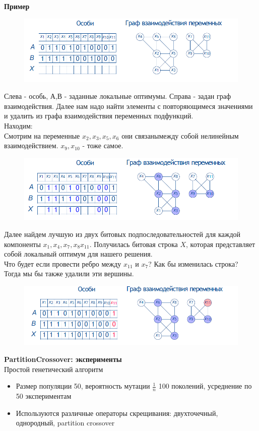 \textbf{Пример}\\
\begin{figure}[h]
\centering
\includegraphics[width=0.8\linewidth]{images/pc1.PNG}
\end{figure}
Слева - особь, А,В - заданные локальные оптимумы. Справа - задан граф взаимодействия. Далее нам надо найти элементы с повторяющимеся значениями и удалить из графа взаимодействия переменных подфункций. \\
Находим:\\
Смотрим на переменные $x_2,x_3,x_5,x_6$ они связанымежду собой нелинейным взаимодействием. $x_9,x_{10}$ - тоже самое.\\
\begin{figure}[h]
\centering
\includegraphics[width=0.8\linewidth]{images/pc3.PNG}
\end{figure}
Далее найдем лучшую из двух битовых подпоследовательностей для каждой компоненты $x_1, x_4,x_7,x_8 x_{11}$. Получилась битовая строка $X$, которая представляет собой локальный оптимум для нашего решения.\\
Что будет если провести ребро между $x_{11}$ и $x_7$? Как бы изменилась строка? \\
Тогда мы бы также удалили эти вершины.\\
\begin{figure}[h]
\centering
\includegraphics[width=0.8\linewidth]{images/pc11.PNG}
\end{figure}

\textbf{PartitionCrossover: эксперименты}\\
Простой генетический алгоритм
\begin{itemize}
    \item Размер популяции 50, вероятность мутации $\frac{1}{n}$ 100 поколений, усреднение по 50 экспериментам
    \item Используются различные операторы скрещивания: двухточечный, однородный, partition crossover
\end{itemize}

